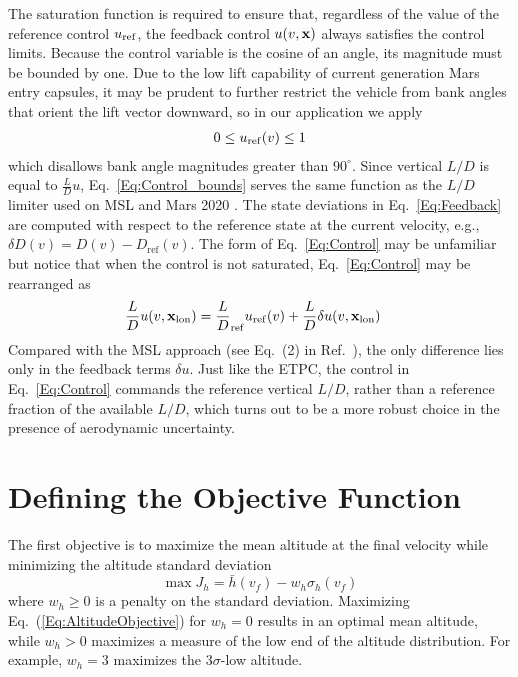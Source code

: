 The saturation function is required to ensure that, regardless of the value of the reference control $ u_{\mathrm{ref}} $, the feedback control $u(v,\mathbf{x})$ always satisfies the control limits. Because the control variable is the cosine of an angle, its magnitude must be bounded by one. Due to the low lift capability of current generation Mars entry capsules, it may be prudent to further restrict the vehicle from bank angles that orient the lift vector downward, so in our application we apply
\begin{align}
	0 \le u_{\mathrm{ref}}(v) \le 1 \label{Eq:Control_bounds}
\end{align}
which disallows bank angle magnitudes greater than $90^\circ$. Since vertical $L/D$ is equal to $\frac{L}{D}u$, Eq.~\eqref{Eq:Control_bounds} serves the same function as the $L/D$ limiter used on MSL and Mars 2020 \cite{MSL_EDL2}.
The state deviations in Eq.~\eqref{Eq:Feedback} are computed with respect to the reference state at the current velocity, e.g., $\delta D(v) = D(v) - D_{\mathrm{ref}}(v)$.
The form of Eq.~\eqref{Eq:Control} may be unfamiliar but notice that when the control is not saturated, Eq.~\eqref{Eq:Control} may be rearranged as
\begin{align}
	\frac{L}{D}u(v,\mathbf{x}_{\mathrm{lon}}) &= \frac{L}{D}_{\mathrm{ref}}u_{\mathrm{ref}}(v) + \frac{L}{D}\delta u(v,\mathbf{x}_{\mathrm{lon}}) \label{Eq:Control_rearranged}
\end{align}
Compared with the MSL approach (see Eq.~(2) in Ref.~\cite{MSL_EDL2}), the only difference lies only in the feedback terms $\delta u$. Just like the ETPC, the control in Eq.~\eqref{Eq:Control} commands the reference vertical $ L/D $, rather than a reference fraction of the available $ L/D $, which turns out to be a more robust choice in the presence of aerodynamic uncertainty.

\section{Defining the Objective Function}
The first objective is to maximize the mean altitude at the final velocity while minimizing the altitude standard deviation
\begin{equation}
	\max J_h = \bar{h}(v_f) - w_h\sigma_h(v_f) \label{Eq:AltitudeObjective}
\end{equation}
where $w_h\ge0$ is a penalty on the standard deviation. Maximizing Eq.~(\ref{Eq:AltitudeObjective}) for $w_h=0$ results in an optimal mean altitude, while $w_h>0$ maximizes a measure of the low end of the altitude distribution. For example, $w_h=3$ maximizes the 3$\sigma$-low altitude. 

